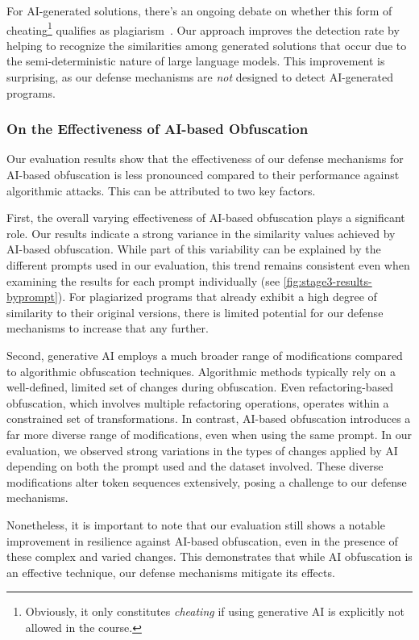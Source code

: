For AI-generated solutions, there's an ongoing debate on whether this form of cheating\footnote{Obviously, it only constitutes \textit{cheating} if using generative AI is explicitly not allowed in the course.} qualifies as plagiarism~\cite{Novak2019, Saglam2024a}.
Our approach improves the detection rate by helping to recognize the similarities among generated solutions that occur due to the semi-deterministic nature of large language models.
This improvement is surprising, as our defense mechanisms are \textit{not} designed to detect AI-generated programs.

\subsubsection{On the Effectiveness of AI-based Obfuscation}

Our evaluation results show that the effectiveness of our defense mechanisms for AI-based obfuscation is less pronounced compared to their performance against algorithmic attacks. This can be attributed to two key factors.

First, the overall varying effectiveness of AI-based obfuscation plays a significant role. Our results indicate a strong variance in the similarity values achieved by AI-based obfuscation. While part of this variability can be explained by the different prompts used in our evaluation, this trend remains consistent even when examining the results for each prompt individually (see \autoref{fig:stage3-results-byprompt}). For plagiarized programs that already exhibit a high degree of similarity to their original versions, there is limited potential for our defense mechanisms to increase that any further.

Second, generative AI employs a much broader range of modifications compared to algorithmic obfuscation techniques. Algorithmic methods typically rely on a well-defined, limited set of changes during obfuscation. Even refactoring-based obfuscation, which involves multiple refactoring operations, operates within a constrained set of transformations. In contrast, AI-based obfuscation introduces a far more diverse range of modifications, even when using the same prompt. In our evaluation, we observed strong variations in the types of changes applied by AI depending on both the prompt used and the dataset involved. These diverse modifications alter token sequences extensively, posing a challenge to our defense mechanisms.

Nonetheless, it is important to note that our evaluation still shows a notable improvement in resilience against AI-based obfuscation, even in the presence of these complex and varied changes. This demonstrates that while AI obfuscation is an effective technique, our defense mechanisms mitigate its effects.

